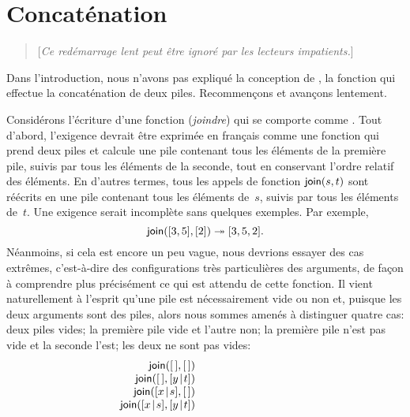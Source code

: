 \section{Concaténation}

\begin{quote}
\small[\textsl{Ce redémarrage lent peut être ignoré par les lecteurs impatients.}]
\end{quote}
Dans l'introduction, nous n'avons pas expliqué la conception de
, la fonction qui effectue la concaténation de deux
piles. Recommençons et avançons lentement.

Considérons l'écriture d'une fonction  (\emph{joindre})
qui se comporte comme . Tout d'abord, l'exigence devrait
être exprimée en français comme une fonction qui prend deux piles et
calcule une pile contenant tous les éléments de la première pile,
suivis par tous les éléments de la seconde, tout en conservant l'ordre
relatif des éléments. En d'autres termes, tous les appels de fonction 
\(\textsf{join}(s,t)\) sont réécrits en une pile contenant tous les
éléments de~\(s\), suivis par tous les éléments de~\(t\). Une exigence
serait incomplète sans quelques exemples. Par exemple,
\begin{equation*}
\textsf{join}([3,5],[2]) \twoheadrightarrow [3,5,2].
\end{equation*}
Néanmoins, si cela est encore un peu vague, nous devrions essayer des
cas extrêmes, c'est-à-dire des configurations très particulières des
arguments, de façon à comprendre plus précisément ce qui est attendu
de cette fonction. Il vient naturellement à l'esprit qu'une pile est
nécessairement vide ou non et, puisque les deux arguments sont des
piles, alors nous sommes amenés à distinguer quatre cas: deux piles
vides; la première pile vide et l'autre non; la première pile n'est
pas vide et la seconde l'est; les deux ne sont pas vides:
\begin{equation*}
\begin{array}{r@{\;}l@{\;}l}
\fun{join}(\el,\el) & \phantom{\rightarrow} & \phantom{\el;}\\
\fun{join}(\el,\cons{y}{t}) & \phantom{\rightarrow} & \phantom{\cons{y}{t};}\\
\fun{join}(\cons{x}{s},\el) & \phantom{\rightarrow} & \phantom{\cons{x}{s};}\\
\fun{join}(\cons{x}{s},\cons{y}{t}) & \phantom{\rightarrow} &
  \phantom{\cons{x}{\fun{join}(s,\cons{y}{t})}.}
\end{array}
\end{equation*}
